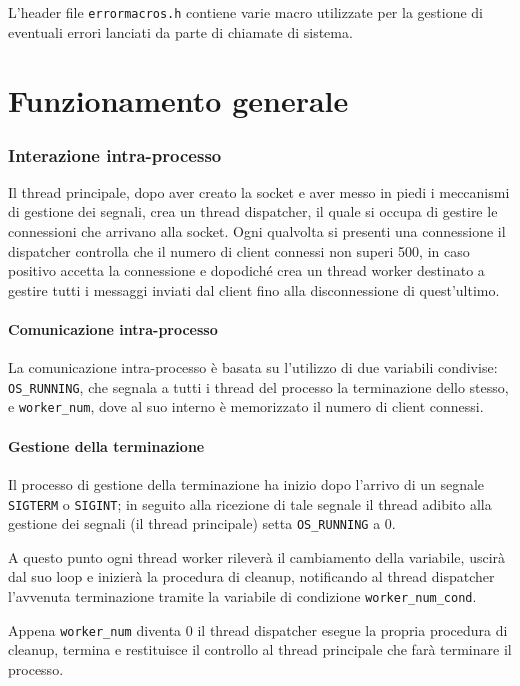 \documentclass[a4paper,11pt]{article}
\begin{document}
L'header file \texttt{errormacros.h} contiene varie macro utilizzate per la gestione di eventuali errori lanciati da parte di chiamate di sistema.
\newpage
\part*{Funzionamento generale}
\renewcommand*{\theHsection}{chY.\the\value{section}}
\setcounter{section}{0}
\section{Interazione intra-processo}
Il thread principale, dopo aver creato la socket e aver messo in piedi i meccanismi di gestione dei segnali, crea un thread dispatcher, il quale
si occupa di gestire le connessioni che arrivano alla socket. Ogni qualvolta si presenti una connessione il dispatcher controlla che il numero di client connessi
non superi 500, in caso positivo accetta la connessione e dopodiché crea un thread worker destinato a gestire tutti i messaggi inviati dal client fino
alla disconnessione di quest'ultimo.
\subsection{Comunicazione intra-processo}
La comunicazione intra-processo è basata su l'utilizzo di due variabili condivise: \texttt{OS\_RUNNING}, che segnala a tutti i thread del processo la terminazione
dello stesso, e \texttt{worker\_num}, dove al suo interno è memorizzato il numero di client connessi.
\subsection{Gestione della terminazione}
Il processo di gestione della terminazione ha inizio dopo l'arrivo di un segnale \texttt{SIGTERM} o \texttt{SIGINT}; in seguito alla ricezione di tale segnale
il thread adibito alla gestione dei segnali (il thread principale) setta \texttt{OS\_RUNNING} a 0.

A questo punto ogni thread worker rileverà il cambiamento della variabile, uscirà dal suo loop e inizierà la procedura di cleanup,
notificando al thread dispatcher l'avvenuta terminazione tramite la variabile di condizione \texttt{worker\_num\_cond}.

Appena \texttt{worker\_num} diventa 0 il thread dispatcher esegue la propria procedura di cleanup, termina e restituisce il controllo al thread principale che farà terminare il processo.
\end{document}
